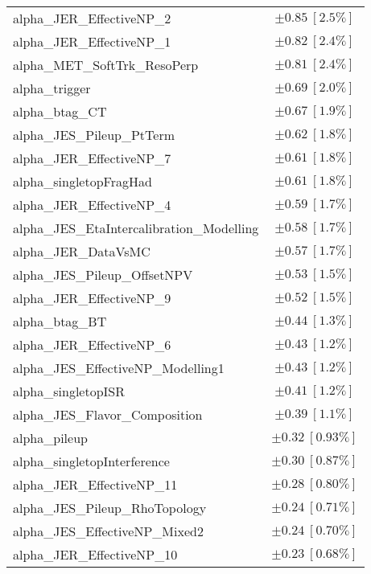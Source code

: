 \begin{table}
\begin{center}
\begin{tabular*}{\textwidth}{@{\extracolsep{\fill}}lc}
alpha\_JER\_EffectiveNP\_2         & $\pm 0.85\ [2.5\%] $       \\
alpha\_JER\_EffectiveNP\_1         & $\pm 0.82\ [2.4\%] $       \\
alpha\_MET\_SoftTrk\_ResoPerp         & $\pm 0.81\ [2.4\%] $       \\
alpha\_trigger         & $\pm 0.69\ [2.0\%] $       \\
alpha\_btag\_CT         & $\pm 0.67\ [1.9\%] $       \\
alpha\_JES\_Pileup\_PtTerm         & $\pm 0.62\ [1.8\%] $       \\
alpha\_JER\_EffectiveNP\_7         & $\pm 0.61\ [1.8\%] $       \\
alpha\_singletopFragHad         & $\pm 0.61\ [1.8\%] $       \\
alpha\_JER\_EffectiveNP\_4         & $\pm 0.59\ [1.7\%] $       \\
alpha\_JES\_EtaIntercalibration\_Modelling         & $\pm 0.58\ [1.7\%] $       \\
alpha\_JER\_DataVsMC         & $\pm 0.57\ [1.7\%] $       \\
alpha\_JES\_Pileup\_OffsetNPV         & $\pm 0.53\ [1.5\%] $       \\
alpha\_JER\_EffectiveNP\_9         & $\pm 0.52\ [1.5\%] $       \\
alpha\_btag\_BT         & $\pm 0.44\ [1.3\%] $       \\
alpha\_JER\_EffectiveNP\_6         & $\pm 0.43\ [1.2\%] $       \\
alpha\_JES\_EffectiveNP\_Modelling1         & $\pm 0.43\ [1.2\%] $       \\
alpha\_singletopISR         & $\pm 0.41\ [1.2\%] $       \\
alpha\_JES\_Flavor\_Composition         & $\pm 0.39\ [1.1\%] $       \\
alpha\_pileup         & $\pm 0.32\ [0.93\%] $       \\
alpha\_singletopInterference         & $\pm 0.30\ [0.87\%] $       \\
alpha\_JER\_EffectiveNP\_11         & $\pm 0.28\ [0.80\%] $       \\
alpha\_JES\_Pileup\_RhoTopology         & $\pm 0.24\ [0.71\%] $       \\
alpha\_JES\_EffectiveNP\_Mixed2         & $\pm 0.24\ [0.70\%] $       \\
alpha\_JER\_EffectiveNP\_10         & $\pm 0.23\ [0.68\%] $       \\

\end{tabular*}
\end{center}
\end{table}
